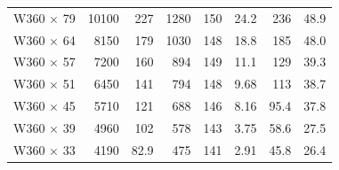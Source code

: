 \documentclass[a4paper,openany,nobib]{tufte-book}
\begin{document}
{{\begin{center}
\begin{tabular}{lrrrrrrr}
W360 \(\times\) 79 & 10100 & 227 & 1280 & 150 & 24.2 & 236 & 48.9\\
W360 \(\times\) 64 & 8150 & 179 & 1030 & 148 & 18.8 & 185 & 48.0\\
W360 \(\times\) 57 & 7200 & 160 & 894 & 149 & 11.1 & 129 & 39.3\\
W360 \(\times\) 51 & 6450 & 141 & 794 & 148 & 9.68 & 113 & 38.7\\
W360 \(\times\) 45 & 5710 & 121 & 688 & 146 & 8.16 & 95.4 & 37.8\\
W360 \(\times\) 39 & 4960 & 102 & 578 & 143 & 3.75 & 58.6 & 27.5\\
W360 \(\times\) 33 & 4190 & 82.9 & 475 & 141 & 2.91 & 45.8 & 26.4\\
\bottomrule
\end{tabular}
\end{center}

}}
\end{document}
